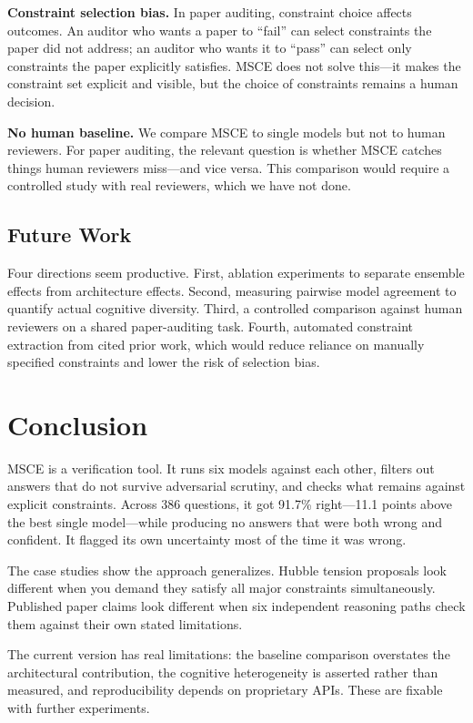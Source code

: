 \documentclass[11pt,a4paper]{article}
\begin{document}
\textbf{Constraint selection bias.} In paper auditing, constraint choice affects outcomes. An auditor who wants a paper to ``fail'' can select constraints the paper did not address; an auditor who wants it to ``pass'' can select only constraints the paper explicitly satisfies. MSCE does not solve this---it makes the constraint set explicit and visible, but the choice of constraints remains a human decision.

\textbf{No human baseline.} We compare MSCE to single models but not to human reviewers. For paper auditing, the relevant question is whether MSCE catches things human reviewers miss---and vice versa. This comparison would require a controlled study with real reviewers, which we have not done.

\subsection{Future Work}

Four directions seem productive. First, ablation experiments to separate ensemble effects from architecture effects. Second, measuring pairwise model agreement to quantify actual cognitive diversity. Third, a controlled comparison against human reviewers on a shared paper-auditing task. Fourth, automated constraint extraction from cited prior work, which would reduce reliance on manually specified constraints and lower the risk of selection bias.

\section{Conclusion}

MSCE is a verification tool. It runs six models against each other, filters out answers that do not survive adversarial scrutiny, and checks what remains against explicit constraints. Across 386 questions, it got 91.7\% right---11.1 points above the best single model---while producing no answers that were both wrong and confident. It flagged its own uncertainty most of the time it was wrong.

The case studies show the approach generalizes. Hubble tension proposals look different when you demand they satisfy all major constraints simultaneously. Published paper claims look different when six independent reasoning paths check them against their own stated limitations.

The current version has real limitations: the baseline comparison overstates the architectural contribution, the cognitive heterogeneity is asserted rather than measured, and reproducibility depends on proprietary APIs. These are fixable with further experiments.
\end{document}
